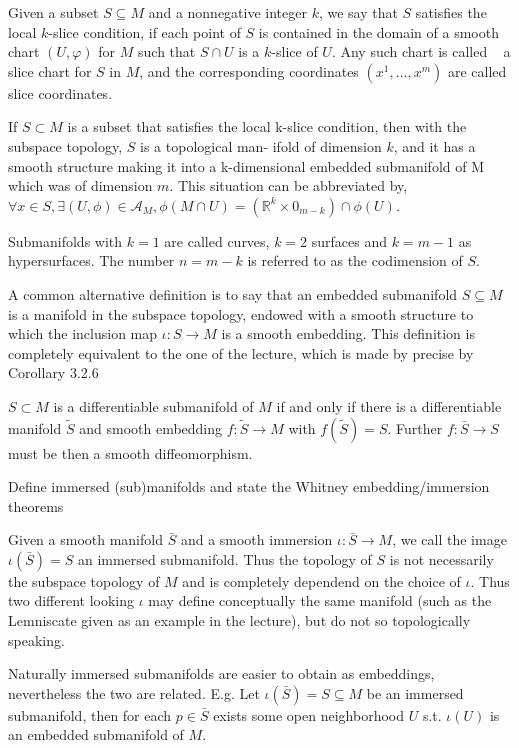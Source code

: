 Given a subset \(S \subseteq M\) and a nonnegative integer \(k\), we say that \(S\) satisfies the local \(k\)-slice condition, 
if each point of \(S\) is contained in the domain of a smooth chart \((U, \varphi)\) for \(M\) such that \(S \cap U\) is a \(k\)-slice of \(U\). Any such chart is called   
a slice chart for \(S\) in \(M\), and the corresponding coordinates \((x^1, \dots, x^m)\) are called slice coordinates.

If \( S \subset M \) is a subset that satisfies the local k-slice condition, then with the subspace topology, \( S \) is a topological man-
ifold of dimension \( k \), and it has a smooth structure making it into a k-dimensional embedded submanifold of M which was of dimension \( m \).
This situation can be abbreviated by, \( \forall x \in S, \exists (U, \phi) \in \mathcal{A}_M, \phi(M \cap U) = (\mathbb{R}^k \times 0_{m-k}) \cap \phi(U) \).

Submanifolds with \( k=1 \) are called curves, \( k=2 \) surfaces and \( k = m - 1 \) as hypersurfaces. The number \( n = m - k \) is referred to as the codimension of \( S \).

A common alternative definition is to say that an embedded submanifold \( S \subseteq M \) is a manifold in the subspace topology, endowed with a smooth
structure to which the inclusion map \( \iota : S \to M \) is a smooth embedding. 
This definition is completely equivalent to the one of the lecture, which is made by precise by Corollary 3.2.6

\( S \subset M \) is a differentiable submanifold of \( M \) if and only if there is a differentiable manifold \( \tilde{S} \) and smooth embedding
\( f : \tilde{S} \to M \) with \( f(\tilde{S}) = S \). Further \( f : \bar{S} \to S \) must be then a smooth diffeomorphism.

Define immersed (sub)manifolds and state the Whitney embedding/immersion theorems

Given a smooth manifold \( \bar{S} \) and a smooth immersion \( \iota : \bar{S} \to M \), we call the image \( \iota(\bar{S}) = S \) an immersed submanifold.
Thus the topology of \( S \) is not necessarily the subspace topology of \( M \) and is completely dependend on the choice of \( \iota \).
Thus two different looking \( \iota \) may define conceptually the same manifold (such as the Lemniscate given as an example in the lecture), but do not so
topologically speaking.

Naturally immersed submanifolds are easier to obtain as embeddings, nevertheless the two are related.
E.g.
Let \( \iota(\bar{S}) = S \subseteq M \) be an immersed submanifold, then for each \( p \in \bar{S} \) exists some open neighborhood \( U \)
s.t. \( \iota(U) \) is an embedded submanifold of \( M \).

